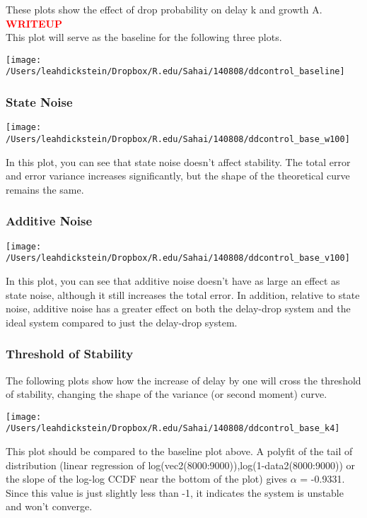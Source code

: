 \documentclass[leqno,twocolumn]{article}
\begin{document}
These plots show the effect of drop probability on delay k and growth A. \textcolor{red}{\textbf{WRITEUP}}\\

This plot will serve as the baseline for the following three plots. 
\begin{center}
\texttt{[image: /Users/leahdickstein/Dropbox/R.edu/Sahai/140808/ddcontrol\_baseline]}\end{center}

\subsubsection{State Noise}
\begin{center}
\texttt{[image: /Users/leahdickstein/Dropbox/R.edu/Sahai/140808/ddcontrol\_base\_w100]}\end{center}

In this plot, you can see that state noise doesn't affect stability. The total error and error variance increases significantly, but the shape of the theoretical curve remains the same.

\subsubsection{Additive Noise}
\begin{center}
\texttt{[image: /Users/leahdickstein/Dropbox/R.edu/Sahai/140808/ddcontrol\_base\_v100]}\end{center}

In this plot, you can see that additive noise doesn't have as large an effect as state noise, although it still increases the total error. In addition, relative to state noise, additive noise has a greater effect on both the delay-drop system and the ideal system compared to just the delay-drop system.

\subsubsection{Threshold of Stability}
The following plots show how the increase of delay by one will cross the threshold of stability, changing the shape of the variance (or second moment) curve.

\begin{center}
\texttt{[image: /Users/leahdickstein/Dropbox/R.edu/Sahai/140808/ddcontrol\_base\_k4]}\end{center}

This plot should be compared to the baseline plot above. A polyfit of the tail of distribution (linear regression of log(vec2(8000:9000)),log(1-data2(8000:9000)) or the slope of the log-log CCDF near the bottom of the plot) gives $\alpha$ = -0.9331. Since this value is just slightly less than -1, it indicates the system is unstable and won't converge.
\end{document}

